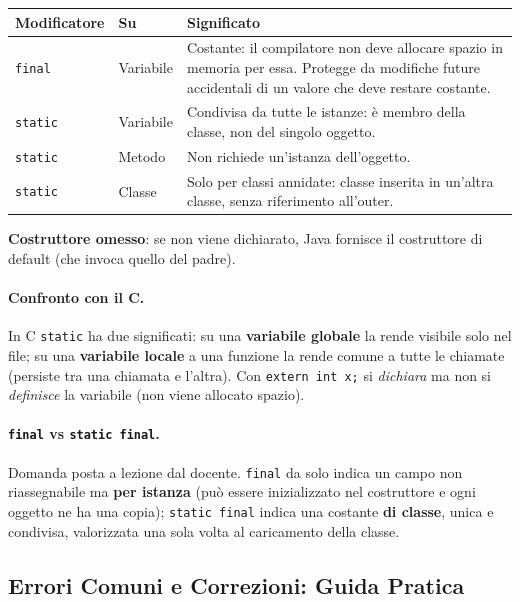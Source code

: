 \documentclass[12pt]{extarticle}
\begin{document}
\begin{center}
\small
\begin{tabular}{p{2.8cm}p{4.2cm}p{7cm}}
    \toprule
    \textbf{Modificatore} & \textbf{Su} & \textbf{Significato} \\
    \midrule
    \texttt{final} & Variabile & Costante: il compilatore non deve allocare spazio in memoria per essa. Protegge da modifiche future accidentali di un valore che deve restare costante. \\
    \addlinespace
    \texttt{static} & Variabile & Condivisa da tutte le istanze: è membro della classe, non del singolo oggetto. \\
    \addlinespace
    \texttt{static} & Metodo & Non richiede un'istanza dell'oggetto. \\
    \addlinespace
    \texttt{static} & Classe & Solo per classi annidate: classe inserita in un'altra classe, senza riferimento all'outer. \\
    \bottomrule
\end{tabular}
\end{center}

\noindent \textbf{Costruttore omesso}: se non viene dichiarato, Java fornisce il costruttore di default (che invoca quello del padre).

\paragraph{Confronto con il C.} In C \texttt{static} ha due significati: su una \textbf{variabile globale} la rende visibile solo nel file; su una \textbf{variabile locale} a una funzione la rende comune a tutte le chiamate (persiste tra una chiamata e l'altra). Con \texttt{extern int x;} si \textit{dichiara} ma non si \textit{definisce} la variabile (non viene allocato spazio).

\paragraph{\texttt{final} vs \texttt{static final}.}
Domanda posta a lezione dal docente. \texttt{final} da solo indica un campo non riassegnabile ma \textbf{per istanza} (può essere inizializzato nel costruttore e ogni oggetto ne ha una copia); \texttt{static final} indica una costante \textbf{di classe}, unica e condivisa, valorizzata una sola volta al caricamento della classe.

\subsection{Errori Comuni e Correzioni: Guida Pratica}
\end{document}
